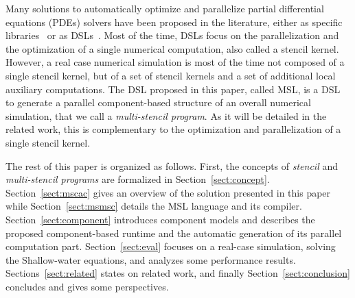 Many solutions to automatically optimize and parallelize partial differential equations (PDEs) solvers have been proposed in the literature, either as specific libraries~\cite{petsc-efficient,Trilinos-Overview,CPE:CPE3494} or as DSLs~\cite{spaaTangCKLL11,citeulike12258902,Giles2011,DeVito2011LDS}. Most of the time, DSLs focus on the parallelization and the optimization of a single numerical computation, also called a stencil kernel.
However, a real case numerical simulation is most of the time not composed of a single stencil kernel, but of a set of stencil kernels and a set of additional local auxiliary computations. The DSL proposed in this paper, called MSL, is a DSL to generate a parallel component-based structure of an overall numerical simulation, that we call a \emph{multi-stencil program}. As it will be detailed in the related work, this is complementary to the optimization and parallelization of a single stencil kernel.

The rest of this paper is organized as follows. First, the concepts of \emph{stencil} and \emph{multi-stencil programs} are formalized in Section~\ref{sect:concept}. Section~\ref{sect:mscac} gives an overview of the solution presented in this paper while Section~\ref{sect:msmsc} details the MSL language and its compiler. Section~\ref{sect:component} introduces component models and describes the proposed component-based runtime and the automatic generation of its parallel computation part.
Section~\ref{sect:eval} focuses on a real-case simulation, solving the Shallow-water equations, and analyzes some performance results. Sections~\ref{sect:related} states on related work, and finally Section~\ref{sect:conclusion} concludes and gives some perspectives.
